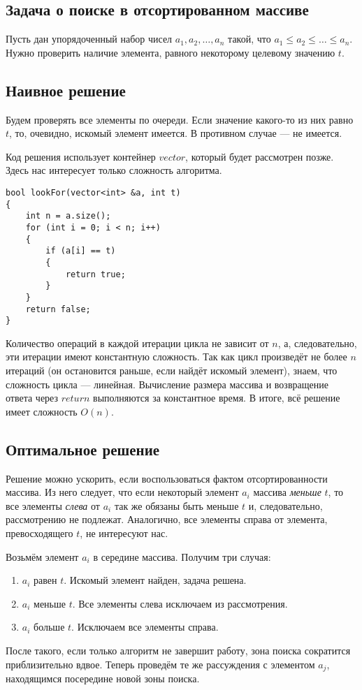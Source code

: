 \subsection{Задача о поиске в отсортированном массиве}
Пусть дан упорядоченный набор чисел $a_1, a_2, \ldots, a_n$ такой, что $a_1 \le a_2 \le \ldots \le a_n$. Нужно проверить наличие элемента, равного некоторому целевому значению $t$.

\subsection*{Наивное решение}
Будем проверять все элементы по очереди. Если значение какого-то из них равно $t$, то, очевидно, искомый элемент имеется. В противном случае --- не имеется.

Код решения использует контейнер $vector$, который будет рассмотрен позже. Здесь нас интересует только сложность алгоритма.
\begin{lstlisting}
bool lookFor(vector<int> &a, int t)
{
    int n = a.size();
    for (int i = 0; i < n; i++)
    {
        if (a[i] == t)
        {
            return true;
        }
    }
    return false;
}
\end{lstlisting}

Количество операций в каждой итерации цикла не зависит от $n$, а, следовательно, эти итерации имеют константную сложность. Так как цикл произведёт не более $n$ итераций (он остановится раньше, если найдёт искомый элемент), знаем, что сложность цикла --- линейная. Вычисление размера массива и возвращение ответа через $return$ выполняются за константное время. В итоге, всё решение имеет сложность $O(n)$.

\subsection*{Оптимальное решение}
Решение можно ускорить, если воспользоваться фактом отсортированности массива. Из него следует, что если некоторый элемент $a_i$ массива \emph{меньше} $t$, то все элементы \emph{слева} от $a_i$ так же обязаны быть меньше $t$ и, следовательно, рассмотрению не подлежат. Аналогично, все элементы справа от элемента, превосходящего $t$, не интересуют нас.

Возьмём элемент $a_i$ в середине массива. Получим три случая:
\begin{enumerate}
    \item $a_i$ равен $t$. Искомый элемент найден, задача решена.
    \item $a_i$ меньше $t$. Все элементы слева исключаем из рассмотрения.
    \item $a_i$ больше $t$. Исключаем все элементы справа.
\end{enumerate}
После такого, если только алгоритм не завершит работу, зона поиска сократится приблизительно вдвое. Теперь проведём те же рассуждения с элементом $a_j$, находящимся посередине новой зоны поиска.

